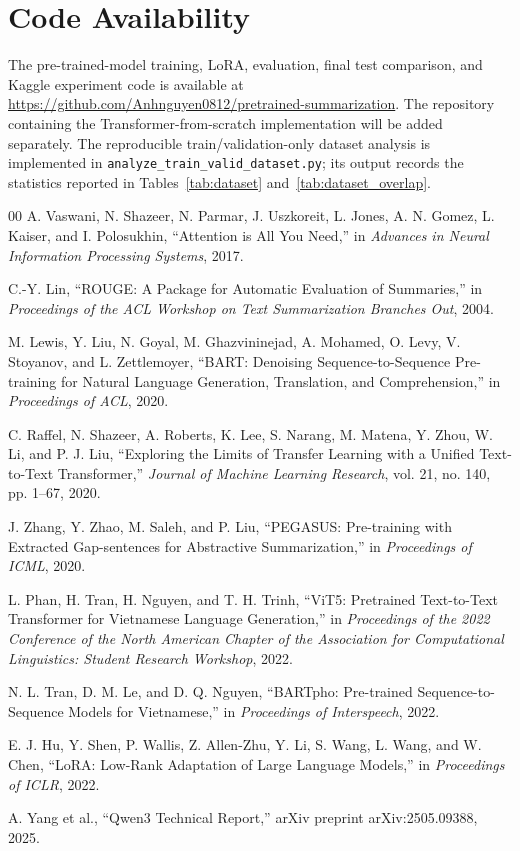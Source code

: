 \documentclass[conference]{IEEEtran}
\begin{document}
\section*{Code Availability}
The pre-trained-model training, LoRA, evaluation, final test comparison, and Kaggle experiment code is available at \url{https://github.com/Anhnguyen0812/pretrained-summarization}. The repository containing the Transformer-from-scratch implementation will be added separately. The reproducible train/validation-only dataset analysis is implemented in \texttt{analyze\_train\_valid\_dataset.py}; its output records the statistics reported in Tables~\ref{tab:dataset} and~\ref{tab:dataset_overlap}.

\begin{thebibliography}{00}
A. Vaswani, N. Shazeer, N. Parmar, J. Uszkoreit, L. Jones, A. N. Gomez, L. Kaiser, and I. Polosukhin, ``Attention is All You Need,'' in \textit{Advances in Neural Information Processing Systems}, 2017.

C.-Y. Lin, ``ROUGE: A Package for Automatic Evaluation of Summaries,'' in \textit{Proceedings of the ACL Workshop on Text Summarization Branches Out}, 2004.

M. Lewis, Y. Liu, N. Goyal, M. Ghazvininejad, A. Mohamed, O. Levy, V. Stoyanov, and L. Zettlemoyer, ``BART: Denoising Sequence-to-Sequence Pre-training for Natural Language Generation, Translation, and Comprehension,'' in \textit{Proceedings of ACL}, 2020.

C. Raffel, N. Shazeer, A. Roberts, K. Lee, S. Narang, M. Matena, Y. Zhou, W. Li, and P. J. Liu, ``Exploring the Limits of Transfer Learning with a Unified Text-to-Text Transformer,'' \textit{Journal of Machine Learning Research}, vol. 21, no. 140, pp. 1--67, 2020.

J. Zhang, Y. Zhao, M. Saleh, and P. Liu, ``PEGASUS: Pre-training with Extracted Gap-sentences for Abstractive Summarization,'' in \textit{Proceedings of ICML}, 2020.

L. Phan, H. Tran, H. Nguyen, and T. H. Trinh, ``ViT5: Pretrained Text-to-Text Transformer for Vietnamese Language Generation,'' in \textit{Proceedings of the 2022 Conference of the North American Chapter of the Association for Computational Linguistics: Student Research Workshop}, 2022.

N. L. Tran, D. M. Le, and D. Q. Nguyen, ``BARTpho: Pre-trained Sequence-to-Sequence Models for Vietnamese,'' in \textit{Proceedings of Interspeech}, 2022.

E. J. Hu, Y. Shen, P. Wallis, Z. Allen-Zhu, Y. Li, S. Wang, L. Wang, and W. Chen, ``LoRA: Low-Rank Adaptation of Large Language Models,'' in \textit{Proceedings of ICLR}, 2022.

A. Yang et al., ``Qwen3 Technical Report,'' arXiv preprint arXiv:2505.09388, 2025.
\end{thebibliography}

\balance
\end{document}
